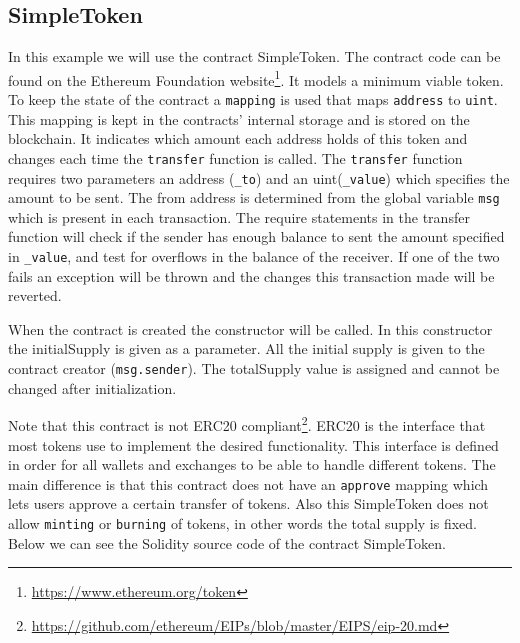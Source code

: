 \documentclass[a4paper]{article}
\begin{document}
\subsection{SimpleToken}
In this example we will use the contract SimpleToken. The contract code can be found on the Ethereum Foundation website\footnote{\url{https://www.ethereum.org/token}}. 
It models a minimum viable token. To keep the state of the contract a \texttt{mapping} is used that maps \texttt{address} to \texttt{uint}. This mapping is kept in the contracts' internal storage and is stored on the blockchain. It indicates which amount each address holds of this token and changes each time the \texttt{transfer} function is called. The \texttt{transfer} function requires two parameters an address (\texttt{\_to})  and an uint(\texttt{\_value}) which specifies the amount to be sent. The from address is determined from the global variable \texttt{msg} which is present in each transaction. The require statements in the transfer function will check if the sender has enough balance to sent the amount specified in \texttt{\_value}, and test for overflows in the balance of the receiver. If one of the two fails an exception will be thrown and the changes this transaction made will be reverted.\par
When the contract is created the constructor will be called. In this constructor the initialSupply is given as a parameter. All the initial supply is given to the contract creator (\texttt{msg.sender}). The totalSupply value is assigned and cannot be changed after initialization.\par
Note that this contract is not ERC20 compliant\footnote{\url{https://github.com/ethereum/EIPs/blob/master/EIPS/eip-20.md}}. ERC20 is the interface that most tokens use to implement the desired functionality. This interface is defined in order for all wallets and exchanges to be able to handle different tokens. The main difference is that this contract does not have an \texttt{approve} mapping which lets users approve a certain transfer of tokens. Also this SimpleToken does not allow \texttt{minting} or \texttt{burning} of tokens, in other words the total supply is fixed. Below we can see the Solidity source code of the contract SimpleToken.


\end{document}
